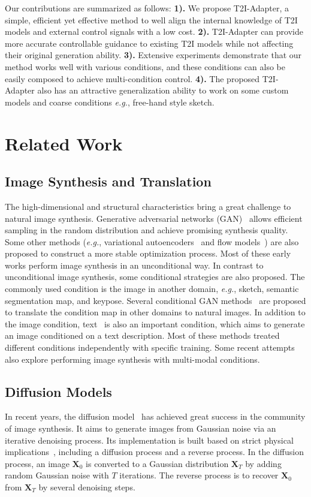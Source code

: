 Our contributions are summarized as follows: 
\textbf{1).} 
We propose T2I-Adapter, a simple, efficient yet effective method to well align the internal knowledge of T2I models and external control signals with a low cost.
\textbf{2).} T2I-Adapter can provide more accurate controllable guidance to existing T2I models while not affecting their original generation ability.
\textbf{3).} Extensive experiments demonstrate that our method works well with various conditions, and these conditions can also be easily composed to achieve multi-condition control. \textbf{4).} The proposed T2I-Adapter also has an attractive generalization ability to work on some custom models and coarse conditions \textit{e.g.}, free-hand style sketch.

\section{Related Work}
\subsection{Image Synthesis and Translation} The high-dimensional and structural characteristics bring a great challenge to natural image synthesis. Generative adversarial networks (GAN)~\cite{gan} allows efficient sampling in the random distribution and achieve promising synthesis quality. Some other methods (\textit{e.g.}, variational autoencoders~\cite{vae} and flow models~\cite{flow}) are also proposed to construct a more stable optimization process. Most of these early works perform image synthesis in an unconditional way. In contrast to unconditional image synthesis, some conditional strategies are also proposed. The commonly used condition is the image in another domain, \textit{e.g.}, sketch, semantic segmentation map, and keypose. Several conditional GAN methods~\cite{i2i1,i2i2,i2i3,i2i4} are proposed to translate the condition map in other domains to natural images. In addition to the image condition, text~\cite{t2i1,t2i2,t2i3,t2i4} is also an important condition, which aims to generate an image conditioned on a text description. Most of these methods treated different conditions independently with specific training. Some recent attempts~\cite{mul1} also explore performing image synthesis with multi-modal conditions. 

\subsection{Diffusion Models} In recent years, the diffusion model~\cite{diff} has achieved great success in the community of image synthesis. It aims to generate images from Gaussian noise via an iterative denoising process. Its implementation is built based on strict physical implications~\cite{phy1,phy2}, including a diffusion process and a reverse process. In the diffusion process, an image $\mathbf{X}_0$ is converted to a Gaussian distribution $\mathbf{X}_T$ by adding random Gaussian noise with $T$ iterations. The reverse process is to recover $\mathbf{X}_0$ from $\mathbf{X}_T$ by several denoising steps.

